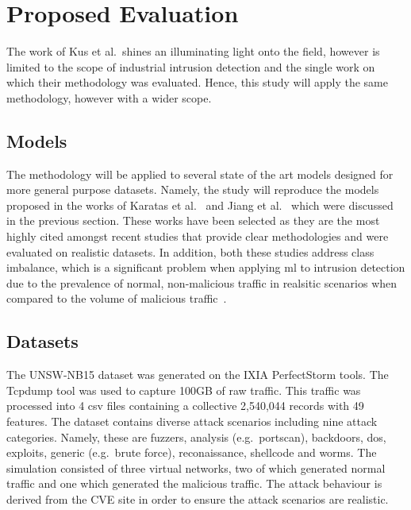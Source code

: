 \chapter{Proposed Evaluation}%
\label{chp:evaluation}

The work of Kus et al.\ shines an illuminating light onto the field, however is
limited to the scope of industrial intrusion detection and the single work on
which their methodology was evaluated. Hence, this study will apply the same
methodology, however with a wider scope.

\section{Models}%
\label{sec:models}

The methodology will be applied to several state of the art models designed for
more general purpose datasets. Namely, the study will reproduce the models
proposed in the works of Karatas et al.~\cite{} and Jiang et al.~\cite{} which
were discussed in the previous section. These works have been selected as they
are the most highly cited amongst recent studies that provide clear
methodologies and were evaluated on realistic datasets. In addition, both these
studies address class imbalance, which is a significant problem when applying
\gls{ml} to intrusion detection due to the prevalence of normal, non-malicious
traffic in realsitic scenarios when compared to the volume of malicious
traffic~\cite{}.

\section{Datasets}%
\label{sec:datasets}

The UNSW-NB15 dataset was generated on the IXIA PerfectStorm tools. The Tcpdump
tool was used to capture 100GB of raw traffic. This traffic was processed into
4 csv files containing a collective 2,540,044 records with 49 features. The
dataset contains diverse attack scenarios including nine attack categories.
Namely, these are fuzzers, analysis (e.g.\ portscan), backdoors, \gls{dos},
exploits, generic (e.g.\ brute force), reconaissance, shellcode and worms. The
simulation consisted of three virtual networks, two of which generated normal
traffic and one which generated the malicious traffic. The attack behaviour is
derived from the CVE site in order to ensure the attack scenarios are
realistic.

